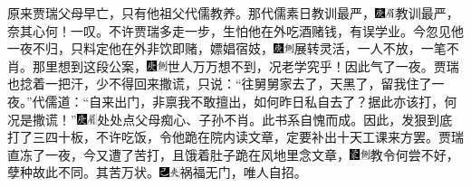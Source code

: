 原来贾瑞父母早亡，只有他祖父代儒教养。那代儒素日教训最严，{\includegraphics[width=3mm]{../Images/00004}\includegraphics[width=3mm]{../Images/00010}\footnotesize \kaishu 教训最严，奈其心何！一叹。}不许贾瑞多走一步，生怕他在外吃酒赌钱，有误学业。今忽见他一夜不归，只料定他在外非饮即赌，嫖娼宿妓，{\includegraphics[width=3mm]{../Images/00004}\includegraphics[width=3mm]{../Images/00011}\footnotesize \kaishu 展转灵活，一人不放，一笔不肖。}那里想到这段公案，{\includegraphics[width=3mm]{../Images/00004}\includegraphics[width=3mm]{../Images/00011}\footnotesize \kaishu 世人万万想不到，况老学究乎！}因此气了一夜。贾瑞也捻着一把汗，少不得回来撒谎，只说：``往舅舅家去了，天黑了，留我住了一夜。''代儒道：``自来出门，非禀我不敢擅出，如何昨日私自去了？据此亦该打，何况是撒谎！''{\includegraphics[width=3mm]{../Images/00004}\includegraphics[width=3mm]{../Images/00010}\footnotesize \kaishu 处处点父母痴心、子孙不肖。此书系自愧而成。}因此，发狠到底打了三四十板，不许吃饭，令他跪在院内读文章，定要补出十天工课来方罢。贾瑞直冻了一夜，今又遭了苦打，且饿着肚子跪在风地里念文章，{\includegraphics[width=3mm]{../Images/00006}\includegraphics[width=3mm]{../Images/00011}\footnotesize \kaishu 教令何尝不好，孽种故此不同。}其苦万状。{\includegraphics[width=3mm]{../Images/00003}\includegraphics[width=3mm]{../Images/00012}\footnotesize \kaishu 祸福无门，唯人自招。}

